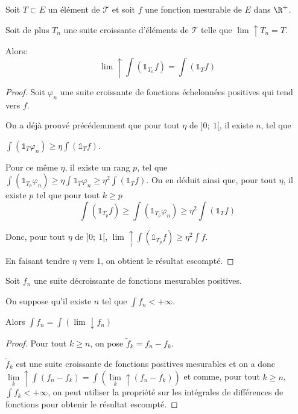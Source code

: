 \begin{lem}
Soit $T \subset E$ un élément de $\mathcal{T}$ et soit $f$ une fonction mesurable de $E$ dans $\R^{+}$.

Soit de plus $T_n$ une suite croissante d'éléments de $\mathcal{T}$ telle que $\lim \uparrow T_n = T$.

Alors:
\[
\lim \uparrow \displaystyle{\int} \left(\mathbb{1}_{T_n} f \right) = \displaystyle{\int} \left(\mathbb{1}_{T} f \right)
\]
\end{lem}

\begin{proof}
Soit $\varphi_n$ une suite croissante de fonctions échelonnées positives qui tend vers $f$.

On a déjà prouvé précédemment que pour tout $\eta$ de $]0;~1[$, il existe $n$, tel que 

$\displaystyle{\int} \left(\mathbb{1}_{T} \varphi_n \right) \geq  \eta \displaystyle{\int} \left( \mathbb{1}_{T} f \right)$.

Pour ce même $\eta$, il existe un rang $p$, tel que $\displaystyle{\int} \left(\mathbb{1}_{T_p}\varphi_n\right) \geq  \eta \displaystyle{\int} \mathbb{1}_{T} \varphi_n \geq \eta^2 \displaystyle{\int} \left(\mathbb{1}_{T}f\right)$. On en déduit ainsi que, pour tout $\eta$, il existe $p$ tel que pour tout $k \geq p$
\[
\displaystyle{\int} \left(\mathbb{1}_{T_p}f\right) \geq \displaystyle{\int} \left(\mathbb{1}_{T_p}\varphi_n\right) \geq \eta^2 \displaystyle{\int} \left(\mathbb{1}_{T} f\right)
\]

Donc, pour tout $\eta$ de $]0;~1[$, $\lim \uparrow \displaystyle{\int} \left(\mathbb{1}_{T_p}f\right) \geq \eta^2 \displaystyle{\int} f$.

En faisant tendre $\eta$ vers $1$, on obtient le résultat escompté.
\end{proof}

\begin{prop}
Soit $f_n$ une suite décroissante de fonctions mesurables positives.

On suppose qu'il existe $n$ tel que $\displaystyle{\int} f_n < +\infty$.

Alors $\displaystyle{\int} f_n = \displaystyle{\int} \left(\lim \downarrow f_n\right)$
\end{prop}

\begin{proof}
Pour tout $k \geq n$, on pose $\tilde{f}_k = f_n-f_k$.  

$\tilde{f}_k$ est une suite croissante de fonctions positives mesurables et on a donc $\lim \limits_{k} \uparrow \displaystyle{\int} (f_n - f_k) = \displaystyle{\int} \left( \lim \limits_{k} \uparrow (f_n - f_k) \right)$ et comme, pour tout $k \geq n$, $\displaystyle{\int} f_k < +\infty$, on peut utiliser la propriété sur les intégrales de différences de fonctions pour obtenir le résultat escompté.
\end{proof}

